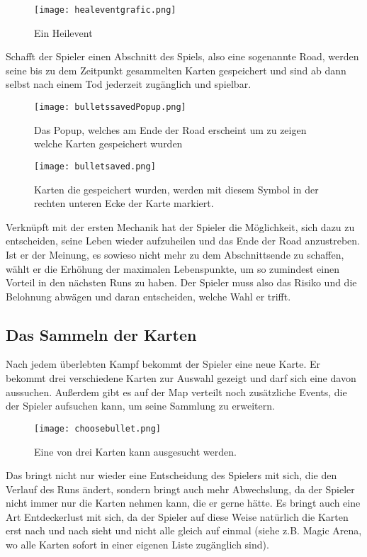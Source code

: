 \begin{figure}[H]
\texttt{[image: healeventgrafic.png]}
\caption{Ein Heilevent}
\end{figure}


Schafft der Spieler einen Abschnitt des Spiels, also eine sogenannte Road, werden seine bis zu dem Zeitpunkt gesammelten Karten
gespeichert und sind ab dann selbst nach einem Tod jederzeit zugänglich und spielbar.

\begin{figure}[H]
    \texttt{[image: bulletssavedPopup.png]}
    \caption{Das Popup, welches am Ende der Road erscheint um zu zeigen welche Karten gespeichert wurden}
\end{figure}


\begin{figure}[H]
    \texttt{[image: bulletsaved.png]}
    \caption{Karten die gespeichert wurden, werden mit diesem Symbol in der rechten unteren Ecke der Karte markiert.}
\end{figure}

Verknüpft mit der ersten Mechanik
hat der Spieler die Möglichkeit, sich dazu zu entscheiden, seine Leben wieder aufzuheilen und das Ende der Road anzustreben.
Ist er der Meinung, es sowieso nicht mehr zu dem Abschnittsende zu schaffen, wählt er die Erhöhung der maximalen
Lebenspunkte, um so zumindest einen Vorteil in den nächsten Runs zu haben. Der Spieler muss also das Risiko und die
Belohnung abwägen und daran entscheiden, welche Wahl er trifft.



\subsection{Das Sammeln der Karten}\label{sammeln_der_Karten}

Nach jedem überlebten Kampf bekommt der Spieler eine neue Karte. Er bekommt drei verschiedene Karten zur Auswahl gezeigt und darf sich eine davon aussuchen.
Außerdem gibt es auf der Map verteilt noch zusätzliche Events, die der Spieler aufsuchen kann, um seine Sammlung zu erweitern.

\begin{figure}[H]
    \texttt{[image: choosebullet.png]}
    \caption{Eine von drei Karten kann ausgesucht werden.}
\end{figure}

Das bringt nicht nur wieder eine Entscheidung des Spielers mit sich, die den Verlauf des Runs ändert, sondern bringt auch mehr Abwechslung,
da der Spieler nicht immer nur die Karten nehmen kann, die er gerne hätte. Es bringt auch eine Art Entdeckerlust mit sich, da der Spieler
auf diese Weise natürlich die Karten erst nach und nach sieht und nicht alle gleich auf einmal (siehe z.B. Magic Arena, wo alle Karten sofort in einer eigenen Liste zugänglich sind). %

